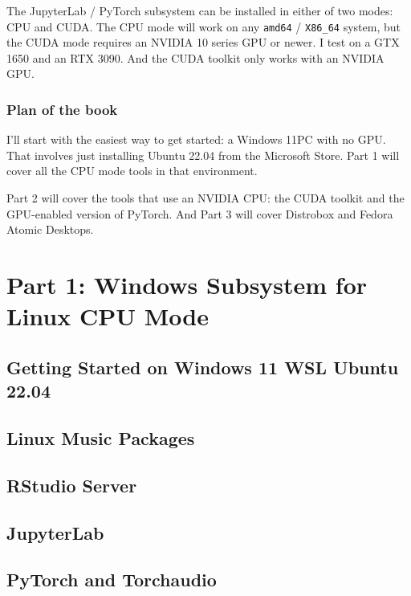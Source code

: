 \documentclass[
  letterpaper,
  DIV=11,
  numbers=noendperiod]{scrreprt}
\begin{document}
The JupyterLab / PyTorch subsystem can be installed in either of two
modes: CPU and CUDA. The CPU mode will work on any \texttt{amd64} /
\texttt{X86\_64} system, but the CUDA mode requires an NVIDIA 10 series
GPU or newer. I test on a GTX 1650 and an RTX 3090. And the CUDA toolkit
only works with an NVIDIA GPU.

\section*{Plan of the book}\label{plan-of-the-book}


I'll start with the easiest way to get started: a Windows 11PC with no
GPU. That involves just installing Ubuntu 22.04 from the Microsoft
Store. Part 1 will cover all the CPU mode tools in that environment.

Part 2 will cover the tools that use an NVIDIA CPU: the CUDA toolkit and
the GPU-enabled version of PyTorch. And Part 3 will cover Distrobox and
Fedora Atomic Desktops.

\part{Part 1: Windows Subsystem for Linux CPU Mode}

\chapter{Getting Started on Windows 11 WSL Ubuntu
22.04}\label{getting-started-on-windows-11-wsl-ubuntu-22.04}

\chapter{Linux Music Packages}\label{linux-music-packages}

\chapter{RStudio Server}\label{rstudio-server}

\chapter{JupyterLab}\label{jupyterlab}

\chapter{PyTorch and Torchaudio}\label{pytorch-and-torchaudio}
\end{document}
